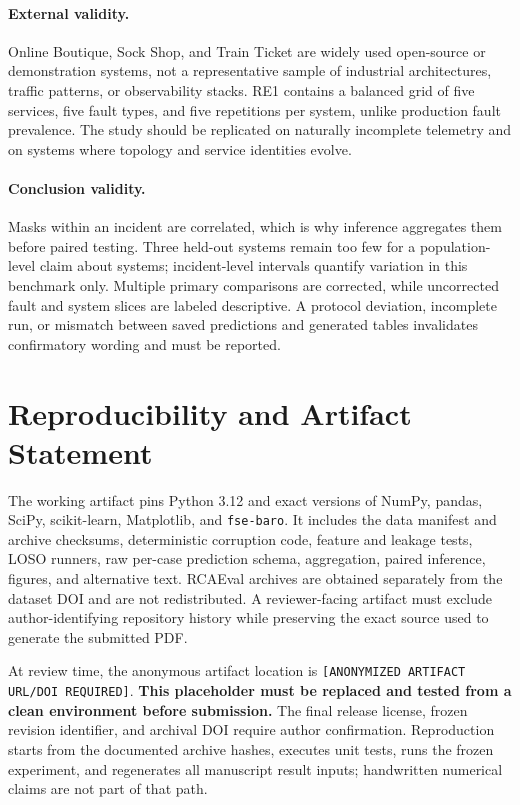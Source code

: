\documentclass[runningheads]{llncs}
\newcommand{\artifactlocation}{[ANONYMIZED ARTIFACT URL/DOI REQUIRED]}
\begin{document}
\paragraph{External validity.}
Online Boutique, Sock Shop, and Train Ticket are widely used open-source or
demonstration systems, not a representative sample of industrial architectures,
traffic patterns, or observability stacks. RE1 contains a balanced grid of five
services, five fault types, and five repetitions per system, unlike production
fault prevalence. The study should be replicated on naturally incomplete
telemetry and on systems where topology and service identities evolve.

\paragraph{Conclusion validity.}
Masks within an incident are correlated, which is why inference aggregates
them before paired testing. Three held-out systems remain too few for a
population-level claim about systems; incident-level intervals quantify
variation in this benchmark only. Multiple primary comparisons are corrected,
while uncorrected fault and system slices are labeled descriptive. A protocol
deviation, incomplete run, or mismatch between saved predictions and generated
tables invalidates confirmatory wording and must be reported.

\section{Reproducibility and Artifact Statement}

The working artifact pins Python 3.12 and exact versions of NumPy, pandas,
SciPy, scikit-learn, Matplotlib, and \texttt{fse-baro}. It includes the data
manifest and archive checksums, deterministic corruption code, feature and
leakage tests, LOSO runners, raw per-case prediction schema, aggregation,
paired inference, figures, and alternative text. RCAEval archives are obtained
separately from the dataset DOI and are not redistributed. A reviewer-facing
artifact must exclude author-identifying repository history while preserving
the exact source used to generate the submitted PDF.

At review time, the anonymous artifact location is
\texttt{\artifactlocation}. \textbf{This placeholder must be replaced and tested
from a clean environment before submission.} The final release license, frozen
revision identifier, and archival DOI require author confirmation. Reproduction
starts from the documented archive hashes, executes unit tests, runs the frozen
experiment, and regenerates all manuscript result inputs; handwritten numerical
claims are not part of that path.
\end{document}
